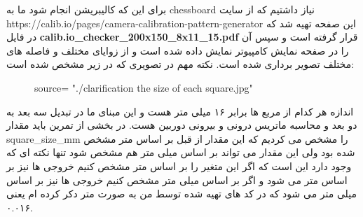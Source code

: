 \documentclass[12pt,a4paper]{article}
\title{}
\author{استاد درس:‌ دکتر جوانمردی، دکتر خادمیان \\ امیررضا کاظم لو \\ \small درس ربات های متحرکت خودگردان \\دانشگاه صنعتی مالک اشتر}
\date{\today}
\begin{document}
\maketitle
برای این که کالیبریشن انجام شود ما به chessboard نیاز داشتیم که از سایت https://calib.io/pages/camera-calibration-pattern-generator این صفحه تهیه شد که در فایل \textbf{calib.io_checker_200x150_8x11_15.pdf} قرار گرفته است و سپس آن را در صفحه نمایش کامپیوتر نمایش داده شده است و از زوایای مختلف و فاصله های مختلف تصویر برداری شده است. نکته مهم در تصویری که در زیر مشخص شده است:
\begin{figure}[H]
	source= "./clarification the size of each square.jpg"
\end{figure}
اندازه هر کدام از مربع ها برابر ۱۶ میلی متر هست و این مبنای ما در تبدیل سه بعد به دو بعد و محاسبه ماتریس درونی و بیرونی دوربین هست.
در بخشی از تمرین باید مقدار square_size_mm را مشخص می کردیم که این مقدار از قبل بر اساس متر مشخص شده بود ولی این مقدار می تواند بر اساس میلی متر هم مشخص شود تنها نکته ای که وجود دارد این است که اگر این متغیر را بر اساس متر مشخص کنیم خروجی ها نیز بر اساس متر می شود و اگر بر اساس میلی متر مشخص کنیم خروجی ها نیز بر اساس میلی متر می شود که در کد های تهیه شده توسط من به صورت متر دکر کرده ام یعنی ۰.۰۱۶.
\end{document}
